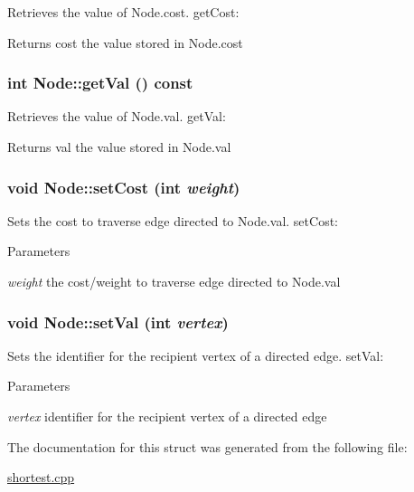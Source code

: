 Retrieves the value of Node.cost. getCost: \begin{DoxyReturn}{Returns}
cost the value stored in Node.cost 
\end{DoxyReturn}
\hypertarget{structNode_a957988714d1379c48c42a78d28c3e76f}{
\subsubsection[{getVal}]{\setlength{\rightskip}{0pt plus 5cm}int Node::getVal () const}}
\label{structNode_a957988714d1379c48c42a78d28c3e76f}


Retrieves the value of Node.val. getVal: \begin{DoxyReturn}{Returns}
val the value stored in Node.val 
\end{DoxyReturn}
\hypertarget{structNode_ac529b9fd9288f957bfb130ec30eae8bf}{
\subsubsection[{setCost}]{\setlength{\rightskip}{0pt plus 5cm}void Node::setCost (int {\em weight})}}
\label{structNode_ac529b9fd9288f957bfb130ec30eae8bf}


Sets the cost to traverse edge directed to Node.val. setCost: 
\begin{DoxyParams}{Parameters}
\item[{\em weight}]the cost/weight to traverse edge directed to Node.val \end{DoxyParams}
\hypertarget{structNode_ad2e319a35d03a16c1e8475025ebe3053}{
\subsubsection[{setVal}]{\setlength{\rightskip}{0pt plus 5cm}void Node::setVal (int {\em vertex})}}
\label{structNode_ad2e319a35d03a16c1e8475025ebe3053}


Sets the identifier for the recipient vertex of a directed edge. setVal: 
\begin{DoxyParams}{Parameters}
\item[{\em vertex}]identifier for the recipient vertex of a directed edge \end{DoxyParams}


The documentation for this struct was generated from the following file:\begin{DoxyCompactItemize}
\item 
\hyperlink{shortest_8cpp}{shortest.cpp}\end{DoxyCompactItemize}
